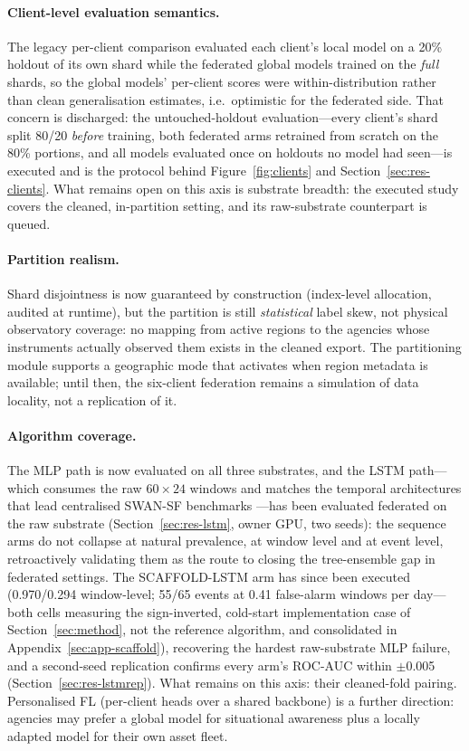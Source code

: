 \paragraph{Client-level evaluation semantics.}
The legacy per-client comparison evaluated each client's local model
on a 20\% holdout of its own shard while the federated global models
trained on the \emph{full} shards, so the global models' per-client
scores were within-distribution rather than clean generalisation
estimates, i.e.\ optimistic for the federated side. That concern is
discharged: the untouched-holdout evaluation---every client's shard
split 80/20 \emph{before} training, both federated arms retrained
from scratch on the 80\% portions, and all models evaluated once on
holdouts no model had seen---is executed and is the protocol behind
Figure~\ref{fig:clients} and Section~\ref{sec:res-clients}. What
remains open on this axis is substrate breadth: the executed study
covers the cleaned, in-partition setting, and its raw-substrate
counterpart is queued.

\paragraph{Partition realism.}
Shard disjointness is now guaranteed by construction (index-level
allocation, audited at runtime), but the partition is still
\emph{statistical} label skew, not physical observatory coverage: no
mapping from active regions to the agencies whose instruments actually
observed them exists in the cleaned export. The partitioning module
supports a geographic mode that activates when region metadata is
available; until then, the six-client federation remains a simulation
of data locality, not a replication of it.

\paragraph{Algorithm coverage.}
The MLP path is now evaluated on all three substrates, and the LSTM
path---which consumes the raw $60\times24$ windows and matches the
temporal
architectures that lead centralised SWAN-SF benchmarks
\cite{hassani2025}---has been evaluated federated on the raw
substrate (Section~\ref{sec:res-lstm}, owner GPU, two seeds): the
sequence arms do not collapse at natural prevalence, at window
level and at event level, retroactively
validating them as the route to closing the tree-ensemble gap in
federated settings. The SCAFFOLD-LSTM arm has since been executed
(0.970/0.294 window-level; 55/65 events at 0.41 false-alarm windows
per day---both cells measuring the sign-inverted, cold-start
implementation case of Section~\ref{sec:method}, not the reference
algorithm, and consolidated in Appendix~\ref{sec:app-scaffold}),
recovering the hardest raw-substrate MLP failure, and a
second-seed replication confirms every arm's ROC-AUC within
$\pm$0.005 (Section~\ref{sec:res-lstmrep}). What remains on
this axis: their cleaned-fold
pairing. Personalised FL
(per-client heads over a shared backbone) is a further direction:
agencies may prefer a global model for situational awareness plus a
locally adapted model for their
own asset fleet.

